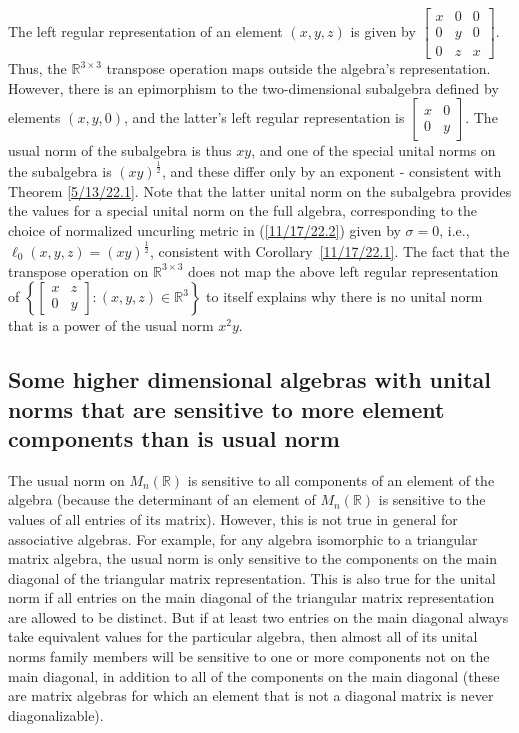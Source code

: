 \documentclass{amsart}
\numberwithin{equation}{section}
\theoremstyle{definition}
\numberwithin{theorem}{section}
\begin{document}
The left regular representation of an element $(x,y,z)$ is given by $\left[\begin{array}{ccc}
x & 0 & 0   \\
 0 & y & 0 \\ 0 & z & x    
\end{array} \right]$.  Thus, the $\mathbb{R}^{3\times 3}$ transpose operation maps outside the algebra's representation.  However, there is an epimorphism to the two-dimensional subalgebra defined by elements $(x,y,0)$, and the latter's left regular representation is 
 $\left[\begin{array}{ccc}
x & 0  \\
 0 & y  
\end{array} \right]$.  The usual norm of the subalgebra is thus $xy$, and one of the special unital norms on the subalgebra is $(xy)^{\frac{1}{2}}$, and these differ only by an exponent - consistent with Theorem \ref{5/13/22.1}.   Note that the latter unital norm on the subalgebra provides the values for a special unital norm on the full algebra, corresponding to the choice of normalized uncurling metric in (\ref{11/17/22.2}) given by $\sigma = 0$, i.e., $\ell_0(x,y,z) = (xy)^{\frac{1}{2}}$, consistent with \mbox{Corollary \ref{11/17/22.1}}.  The fact that the transpose operation on $\mathbb{R}^{3\times 3}$ does not map the above left regular representation of $\left\{\left[\begin{array}{ccc}
x & z  \\
 0 & y  
\end{array} \right]:(x,y,z)\in \mathbb{R}^3\right\}$ to itself explains why there is no unital norm that is a power of the usual norm $x^2y$.
  
\subsection{Some higher dimensional algebras with unital norms that are sensitive to more element components than is  usual norm}

The usual norm on $ M_n(\mathbb{R})$ is sensitive to all components of an element of the algebra (because the determinant of an element of $ M_n(\mathbb{R})$  is sensitive to the values of all entries of its matrix).    However, this is not true in general for associative algebras.  For example, for any algebra isomorphic to a triangular matrix algebra, the usual norm is only sensitive to the components on the main diagonal of the triangular matrix representation.  This is also true for the unital norm if all entries on the main diagonal of the triangular matrix representation are allowed to be distinct.  But if  at least two entries on the main diagonal always take equivalent values for the particular algebra,  then almost all of its unital norms family members will be sensitive to one or more components not on the main diagonal, in addition to all of the components on the main diagonal (these are matrix algebras for which an element that is not a diagonal matrix is never diagonalizable).  
\end{document}

